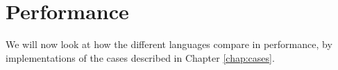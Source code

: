 
\chapter{Performance}
\label{chap:performance}
We will now look at how the different languages compare in
performance, by implementations of the cases described in Chapter
\ref{chap:cases}.






